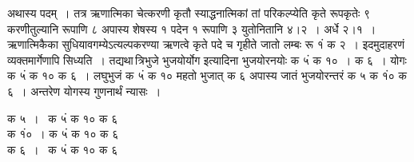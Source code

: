 \documentclass[11pt, openany]{book}
\begin{document}
\begin{sloppypar}
अथास्य पदम्~। तत्र ऋणात्मिका चेत्करणी कृतौ स्याद्धनात्मिकां तां परिकल्प्येति कृते रूपकृतेः ९ करणीतुल्यानि रूपाणि ८ अपास्य शेषस्य १ पदेन १ रूपाणि ३ युतोनितानि ४।२~। अर्धे २।१~। ऋणात्मिकैका सुधियावगम्येऽत्यल्पकरण्या ऋणत्वे कृते पदे च गृहीते जातो लम्बः रू १ं क २~। इदमुदाहरणं व्यक्तमार्गेणापि सिध्यति~। तद्यथा\textendash \,त्रिभुजे भुजयोर्योग इत्यादिना भुजयोरनयोः क ५ं क १०~। क ६~। योगः क ५ं क १० क ६~। लघुभुजं क ५ं क १० महतो भुजात् क ६ अपास्य जातं भुजयोरन्तरं क ५ क १ं० क ६~। अन्तरेण योगस्य गुणनार्थं न्यासः~।
\vspace{-2mm}

\begin{center}
 क ५~। ~क ५ं क १० क ६\\
 क १ं०~। क ५ं क १० क ६\\
 क ६~। ~क ५ं क १० क ६
\end{center}
\end{sloppypar}

\newpage
\end{document}
